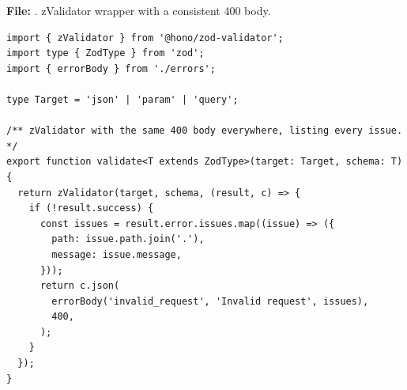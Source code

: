 \documentclass[11pt,a4paper]{article}
\begin{document}
\textbf{File:} . zValidator wrapper with a consistent 400 body.\par
\begin{lstlisting}
import { zValidator } from '@hono/zod-validator';
import type { ZodType } from 'zod';
import { errorBody } from './errors';

type Target = 'json' | 'param' | 'query';

/** zValidator with the same 400 body everywhere, listing every issue. */
export function validate<T extends ZodType>(target: Target, schema: T) {
  return zValidator(target, schema, (result, c) => {
    if (!result.success) {
      const issues = result.error.issues.map((issue) => ({
        path: issue.path.join('.'),
        message: issue.message,
      }));
      return c.json(
        errorBody('invalid_request', 'Invalid request', issues),
        400,
      );
    }
  });
}
\end{lstlisting}
\end{document}

